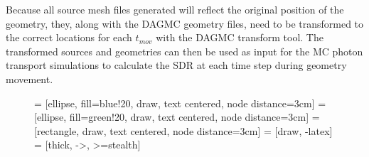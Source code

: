 Because all
source mesh files generated will reflect the original position of the geometry,
they, along with the DAGMC geometry files, need to be transformed to the 
correct locations for each $t_{mov}$ with the DAGMC transform tool.  The
transformed sources and geometries can then be used as input for the MC photon
transport simulations to calculate the SDR at each time step during geometry movement.

\begin{figure}
\centering

         = [ellipse, fill=blue!20, draw, text centered, node distance=3cm]
         = [ellipse, fill=green!20, draw, text centered, node distance=3cm]
         = [rectangle, draw, text centered, node distance=3cm]
         = [draw, -latex]
         = [thick, ->, >=stealth]
        

\end{figure}
